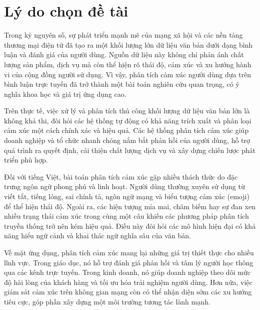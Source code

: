 \documentclass[14pt, a4paper]{report}
\begin{document}
\renewcommand{\thesection}{\arabic{section}.}
\renewcommand{\thesubsection}{\arabic{section}.\arabic{subsection}.}
\renewcommand{\thesubsubsection}{\arabic{section}.\arabic{subsection}.\arabic{subsubsection}.}

\section{Lý do chọn đề tài}

Trong kỷ nguyên số, sự phát triển mạnh mẽ của mạng xã hội và các nền tảng thương mại điện tử đã tạo ra một khối lượng lớn dữ liệu văn bản dưới dạng bình luận và đánh giá của người dùng. Nguồn dữ liệu này không chỉ phản ánh chất lượng sản phẩm, dịch vụ mà còn thể hiện rõ thái độ, cảm xúc và xu hướng hành vi của cộng đồng người sử dụng. Vì vậy, phân tích cảm xúc người dùng dựa trên bình luận trực tuyến đã trở thành một bài toán nghiên cứu quan trọng, có ý nghĩa khoa học và giá trị ứng dụng cao.

Trên thực tế, việc xử lý và phân tích thủ công khối lượng dữ liệu văn bản lớn là không khả thi, đòi hỏi các hệ thống tự động có khả năng trích xuất và phân loại cảm xúc một cách chính xác và hiệu quả. Các hệ thống phân tích cảm xúc giúp doanh nghiệp và tổ chức nhanh chóng nắm bắt phản hồi của người dùng, hỗ trợ quá trình ra quyết định, cải thiện chất lượng dịch vụ và xây dựng chiến lược phát triển phù hợp.

Đối với tiếng Việt, bài toán phân tích cảm xúc gặp nhiều thách thức do đặc trưng ngôn ngữ phong phú và linh hoạt. Người dùng thường xuyên sử dụng từ viết tắt, tiếng lóng, sai chính tả, ngôn ngữ mạng và biểu tượng cảm xúc (emoji) để thể hiện thái độ. Ngoài ra, các hiện tượng mỉa mai, châm biếm hay sự đan xen nhiều trạng thái cảm xúc trong cùng một câu khiến các phương pháp phân tích truyền thống trở nên kém hiệu quả. Điều này đòi hỏi các mô hình hiện đại có khả năng hiểu ngữ cảnh và khai thác ngữ nghĩa sâu của văn bản.

Về mặt ứng dụng, phân tích cảm xúc mang lại những giá trị thiết thực cho nhiều lĩnh vực. Trong giáo dục, nó hỗ trợ đánh giá phản hồi và tâm lý người học thông qua các kênh trực tuyến. Trong kinh doanh, nó giúp doanh nghiệp theo dõi mức độ hài lòng của khách hàng và tối ưu hóa trải nghiệm người dùng. Hơn nữa, việc giám sát cảm xúc trên không gian mạng còn có thể nhận diện sớm các xu hướng tiêu cực, góp phần xây dựng một môi trường tương tác lành mạnh.
\end{document}
